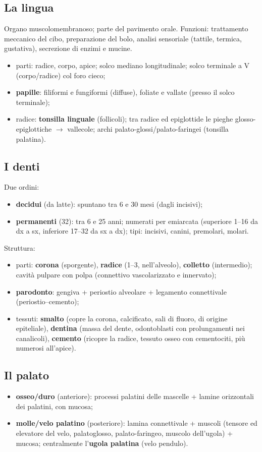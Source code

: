 \subsection{La lingua}
Organo muscolomembranoso; parte del pavimento orale. Funzioni: trattamento meccanico del cibo,
preparazione del bolo, analisi sensoriale (tattile, termica, gustativa), secrezione di enzimi e
mucine.
\begin{itemize}
  \item parti: radice, corpo, apice; solco mediano longitudinale; solco terminale a V (corpo/radice)
    col foro cieco;
  \item \textbf{papille}: filiformi e fungiformi (diffuse), foliate e vallate (presso il solco
    terminale);
  \item radice: \textbf{tonsilla linguale} (follicoli); tra radice ed epiglottide le pieghe
    glosso-epiglottiche $\rightarrow$ vallecole; archi palato-glossi/palato-faringei (tonsilla
    palatina).
\end{itemize}

\subsection{I denti}
Due ordini:
\begin{itemize}
  \item \textbf{decidui} (da latte): spuntano tra 6 e 30 mesi (dagli incisivi);
  \item \textbf{permanenti} (32): tra 6 e 25 anni; numerati per emiarcata (superiore 1--16 da dx a
    sx, inferiore 17--32 da sx a dx); tipi: incisivi, canini, premolari, molari.
\end{itemize}
Struttura:
\begin{itemize}
  \item parti: \textbf{corona} (sporgente), \textbf{radice} (1--3, nell'alveolo), \textbf{colletto}
    (intermedio); cavità pulpare con polpa (connettivo vascolarizzato e innervato);
  \item \textbf{parodonto}: gengiva + periostio alveolare + legamento connettivale (periostio--cemento);
  \item tessuti: \textbf{smalto} (copre la corona, calcificato, sali di fluoro, di origine
    epiteliale), \textbf{dentina} (massa del dente, odontoblasti con prolungamenti nei canalicoli),
    \textbf{cemento} (ricopre la radice, tessuto osseo con cementociti, più numerosi all'apice).
\end{itemize}

\subsection{Il palato}
\begin{itemize}
  \item \textbf{osseo/duro} (anteriore): processi palatini delle mascelle + lamine orizzontali dei
    palatini, con mucosa;
  \item \textbf{molle/velo palatino} (posteriore): lamina connettivale + muscoli (tensore ed elevatore
    del velo, palatoglosso, palato-faringeo, muscolo dell'ugola) + mucosa; centralmente l'\textbf{ugola
    palatina} (velo pendulo).
\end{itemize}

